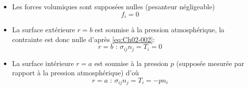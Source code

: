 \begin{itemize}
    \item Les forces volumiques sont supposées nulles (pesanteur négligeable)
        \begin{equation}
            f_i = 0
            \label{eq:Ch04-001}
        \end{equation}
    \item La surface extérieure $r=b$ est soumise à la pression atmosphérique, la contrainte est donc nulle d'après \eqref{eq:Ch02-002}:
        \begin{equation}
            r=b \text{ : } \sigma_{ij} n_j = T_i = 0
            \label{eq:Ch04-002}
        \end{equation}
    \item La surface intérieure $r=a$ est soumise à la pression $p$ (supposée mesurée par rapport à la pression atmosphérique) d'où
        \begin{equation}
            r=a \text{ : } \sigma_{ij} n_j = T_i = -p n_i
            \label{eq:Ch04-003}
        \end{equation}
\end{itemize}
